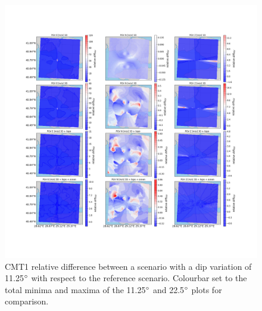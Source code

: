 \documentclass[../Text/00main.tex]{subfiles}
\begin{document}
\begin{figure}[h]
    \centering
    \includegraphics[width=1\linewidth,trim = 2cm 5cm 1cm 5cm, clip]{images_results/dip_variation_epsilon12_sc1.png}
    \caption{CMT1 relative difference between a scenario with a dip variation of 11.25$\degree$ with respect to the reference scenario. Colourbar set to the total minima and maxima of the 11.25$\degree$ and 22.5$\degree$ plots for comparison.}
    \label{fig:ref_eps12-1_dip}
\end{figure}
\end{document}
